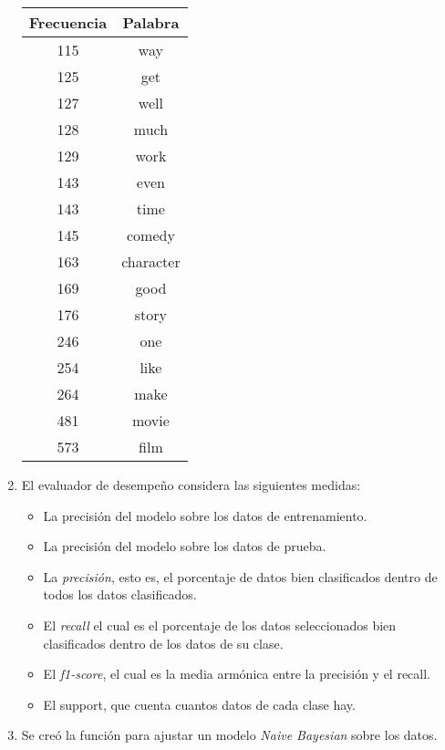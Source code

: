 \documentclass[11pt,letterpaper]{article}
\begin{document}
\begin{enumerate}
\begin{center}
\begin{tabular}{|c|c|}
Frecuencia & Palabra\\
\hline
115 & way\\
125 & get\\
127 & well\\
128 & much\\
129 & work\\
143 & even\\
143 & time\\
145 & comedy\\
163 & character\\
169 & good\\
176 & story\\
246 & one\\
254 & like\\
264 & make\\
481 & movie\\
573 & film\\
\hline
\end{tabular}
\end{center}
\item El evaluador de desempeño considera las siguientes medidas:
\begin{itemize}
\item La precisión del modelo sobre los datos de entrenamiento.
\item La precisión del modelo sobre los datos de prueba.
\item La \emph{precisión}, esto es, el porcentaje de datos bien clasificados dentro de
todos los datos clasificados.
\item El \emph{recall} el cual es el porcentaje de los datos seleccionados bien
clasificados dentro de los datos de su clase.
\item El \emph{f1-score}, el cual es la media armónica entre la precisión y el
recall.
\item El support, que cuenta cuantos datos de cada clase hay.
\end{itemize}
\item Se creó la función para ajustar un modelo \emph{Naive Bayesian} sobre los datos.
\end{enumerate}
\end{document}

